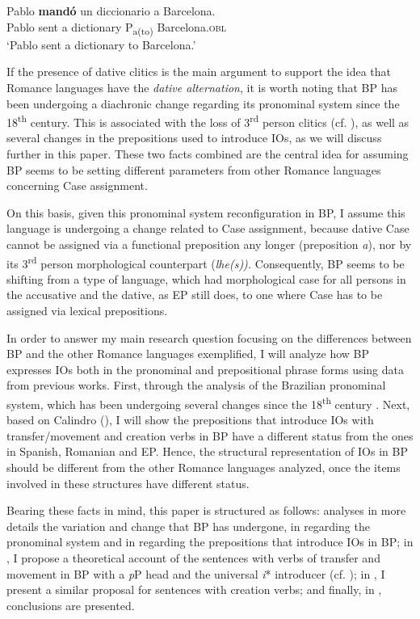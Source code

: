 \documentclass[output=paper,colorlinks,citecolor=brown,modfonts,nonflat]{langsci/langscibook}
\begin{document}
\ea%
    \label{ex:calindro:9}
    \gll Pablo \textbf{mandó} un diccionario  {a} {Barcelona}.\\
    Pablo  sent      a dictionary     P\textsubscript{{a(to)}} Barcelona.\textsc{obl}\\
    \glt `Pablo sent a dictionary to Barcelona.'\hfill \citep[48]{Cuervo2003}
    \z

If the presence of dative clitics is the main argument to support the idea that Romance languages have the \textit{dative alternation}, it is worth noting that BP has been undergoing a diachronic change regarding its pronominal system since the 18\textsuperscript{th} century. This is associated with the loss of 3\textsuperscript{rd} person clitics (cf. \citealt{CarvalhoCalindro2018}), as well as several changes in the prepositions used to introduce IOs, as we will discuss further in this paper. These two facts combined are the central idea for assuming BP seems to be setting different parameters from other Romance languages concerning Case assignment.

On this basis, given this pronominal system reconfiguration in BP, I assume this language is undergoing a change related to Case assignment, because dative Case cannot be assigned via a functional preposition any longer (preposition \textit{a}), nor by its 3\textsuperscript{rd} person morphological counterpart (\textit{lhe(s)).} Consequently, BP seems to be shifting from a type of language, which had morphological case for all persons in the accusative and the dative, as EP still does, to one where Case has to be assigned via lexical prepositions.

In order to answer my main research question focusing on the differences between BP and the other Romance languages exemplified, I will analyze how BP expresses IOs both in the pronominal and prepositional phrase forms using data from previous works. First, through the analysis of the Brazilian pronominal system, which has been undergoing several changes since the 18\textsuperscript{th} century \citep{KatoCyrinoCorrêa2009}. Next, based on Calindro (\citeyear{Calindro2015,Calindro2016}), I will show the prepositions that introduce IOs with transfer/movement and creation verbs in BP have a different status from the ones in Spanish, Romanian and EP. Hence, the structural representation of IOs in BP should be different from the other Romance languages analyzed, once the items involved in these structures have different status.

Bearing these facts in mind, this paper is structured as follows:  analyses in more details the variation and change that BP has undergone, in  regarding the pronominal system and in  regarding the prepositions that introduce IOs in BP; in , I propose a theoretical account of the sentences with verbs of transfer and movement in BP with a \textit{p}P head and the universal \textit{i}* introducer (cf. \citealt{Wood2012, WoodMarantz2017}); in , I present a similar proposal for sentences with creation verbs; and finally, in , conclusions are presented.
\end{document}
